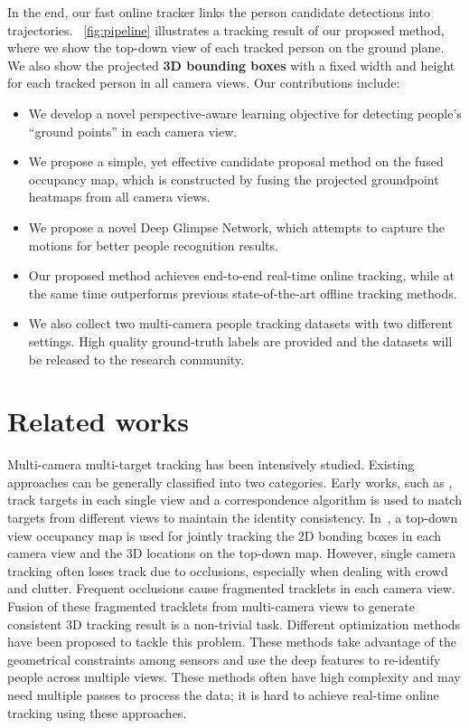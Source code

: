 \documentclass{article}
\begin{document}
In the end, our fast online tracker links the person candidate detections into trajectories. \figurename~\ref{fig:pipeline} illustrates
a tracking result of our proposed method, where we show the top-down view of each tracked person on the ground plane. We also show
the projected \textbf{3D bounding boxes} with a fixed width and height for each tracked person in all camera views. 
Our contributions include:
\begin{itemize}
	\item We develop a novel perspective-aware learning objective for detecting people's ``ground points'' in each camera view.
	\item We propose a simple, yet effective candidate proposal method on the fused occupancy map, which is constructed by fusing the projected groundpoint heatmaps from all camera views.  
	\item We propose a novel Deep Glimpse Network, which attempts to capture the motions for better people recognition results.
	\item Our proposed method achieves end-to-end real-time online tracking, while at the same time outperforms
	previous state-of-the-art offline tracking methods.
	\item We also collect two multi-camera people tracking datasets with two different settings. High quality ground-truth labels are provided and the datasets will be released to the research community.
\end{itemize}


\section{Related works}
Multi-camera multi-target tracking has been intensively studied.
Existing approaches can be generally classified into two categories.
Early works, such as \cite{singletrack1}, track targets in
each single view and a correspondence algorithm is used to match targets from different views to maintain the identity consistency.
In~\cite{medioni}, 
a top-down view
occupancy map is used for jointly tracking the 2D bonding boxes in each camera view and the 3D locations on the top-down map.
However, single camera
tracking often loses track due to occlusions, especially
when dealing with crowd and clutter.
Frequent occlusions cause fragmented tracklets in each camera view.
Fusion of these fragmented tracklets from multi-camera views to generate consistent 3D tracking result is
a non-trivial task. Different optimization methods \cite{opt1,opt2,opt3} have been proposed to tackle
this problem. These methods take advantage of the geometrical constraints
among sensors and use the deep features to re-identify people across multiple
views. These methods often have high complexity and may need multiple passes to process the data;
it is hard to achieve real-time online tracking using these approaches.
\end{document}
